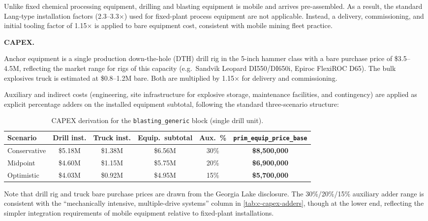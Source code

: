 \noindent Unlike fixed chemical processing equipment, drilling and blasting equipment is mobile and arrives pre-assembled. As a result, the standard Lang-type installation factors (2.3--3.3$\times$) used for fixed-plant process equipment are not applicable. Instead, a delivery, commissioning, and initial tooling factor of 1.15$\times$ is applied to bare equipment cost, consistent with mobile mining fleet practice.

\medskip
\noindent\textbf{CAPEX.}\quad

Anchor equipment is a single production down-the-hole (DTH) drill rig in the 5-inch hammer class with a bare purchase price of \$3.5--4.5M, reflecting the market range for rigs of this capacity (e.g.\ Sandvik Leopard DI550/DI650i, Epiroc FlexiROC D65). The bulk explosives truck is estimated at \$0.8--1.2M bare. Both are multiplied by 1.15$\times$ for delivery and commissioning.

Auxiliary and indirect costs (engineering, site infrastructure for explosive storage, maintenance facilities, and contingency) are applied as explicit percentage adders on the installed equipment subtotal, following the standard three-scenario structure:

\begin{table}[h!]
\caption{CAPEX derivation for the \texttt{blasting\_generic} block (single drill unit).}
\centering
\begin{tabular}{lccccc}
\toprule
\textbf{Scenario} & \textbf{Drill inst.} & \textbf{Truck inst.} & \textbf{Equip.\ subtotal} & \textbf{Aux.\ \%} & \texttt{prim\_equip\_price\_base} \\
\midrule
Conservative & \$5.18M & \$1.38M & \$6.56M & 30\% & \textbf{\$8,500,000} \\
Midpoint     & \$4.60M & \$1.15M & \$5.75M & 20\% & \textbf{\$6,900,000} \\
Optimistic   & \$4.03M & \$0.92M & \$4.95M & 15\% & \textbf{\$5,700,000} \\
\bottomrule
\end{tabular}
\end{table}

\noindent Note that drill rig and truck bare purchase prices are drawn from the Georgia Lake disclosure. The 30\%/20\%/15\% auxiliary adder range is consistent with the ``mechanically intensive, multiple-drive systems'' column in \ref{tab:c-capex-adders}, though at the lower end, reflecting the simpler integration requirements of mobile equipment relative to fixed-plant installations.

